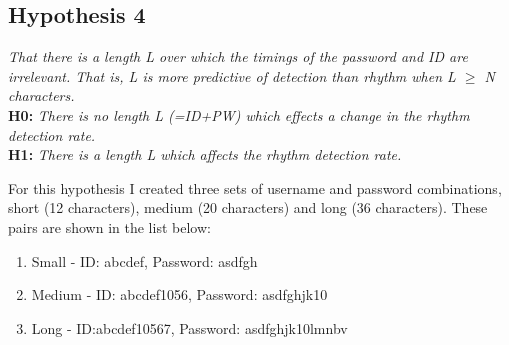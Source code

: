 \documentclass{article}
\begin{document}
\subsection{Hypothesis 4} \label{hypo4}
\begin{center}
\textit{That there is a length L over which the timings of the password and ID are
irrelevant. That is, L is more predictive of detection than rhythm when L $\geq$ N characters.} \newline \\

\textbf{H0:} \textit{There	is	no	length	L	(=ID+PW) which	effects	a	change	in	the	rhythm detection	rate.} \newline \\

\textbf{H1:} \textit{There	is	a	length	L	which	affects	the	rhythm	detection	rate.}
\end{center}

For this hypothesis I created three sets of username and password combinations, short (12 characters), medium (20 characters) and long (36 characters). These pairs are shown in the list below: 

\begin{enumerate}
    \item Small - ID: abcdef, Password: asdfgh
    \item Medium - ID: abcdef1056, Password: asdfghjk10
    \item Long - ID:abcdef10567, Password: asdfghjk10lmnbv
\end{enumerate}
\end{document}
